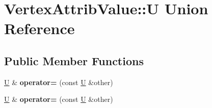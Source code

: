 \hypertarget{unionVertexAttribValue_1_1U}{}\section{Vertex\+Attrib\+Value\+:\+:U Union Reference}
\label{unionVertexAttribValue_1_1U}
\subsection*{Public Member Functions}
\begin{DoxyCompactItemize}
\item 
\mbox{\label{unionVertexAttribValue_1_1U_a749d549fd611add88ea8d7b6dd486093}} 
\hyperlink{unionVertexAttribValue_1_1U}{U} \& {\bfseries operator=} (const \hyperlink{unionVertexAttribValue_1_1U}{U} \&other)
\item 
\mbox{\label{unionVertexAttribValue_1_1U_a749d549fd611add88ea8d7b6dd486093}} 
\hyperlink{unionVertexAttribValue_1_1U}{U} \& {\bfseries operator=} (const \hyperlink{unionVertexAttribValue_1_1U}{U} \&other)
\end{DoxyCompactItemize}
